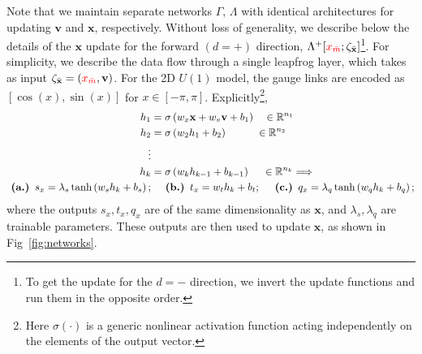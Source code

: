 \documentclass[a4paper,11pt]{article}
\newcommand{\x}{\mathbf{x}}
\newcommand{\p}{\mathbf{v}}
\newcommand{\xmaskbar}{\textcolor{red}{x_{\bar{m}}}}
\begin{document}
Note that we maintain separate networks \(\Gamma\), \(\Lambda\) with
identical architectures for updating \(\p\) and \(\x\), respectively.
%
Without loss of generality, we describe below the details of the \(\x\) update
for the forward \((d = +)\) direction, \(\Lambda^{+}[\xmaskbar;
\zeta_{\bar{\x}}]\)\footnote{
    To get the update for the \(d=-\) direction, we invert the
    update functions and run them in the opposite order.
}.
%
For simplicity, we describe the data flow through a single leapfrog layer,
%
which takes as input \(\zeta_{\bar{\x}} = (\xmaskbar, \p)\).
%
For the 2D \(U(1)\) model, the gauge links are encoded as \([\cos(x),
\sin(x)]\) for \(x \in [-\pi, \pi]\).
%
Explicitly\footnote{
Here \(\sigma(\cdot)\) is a generic nonlinear activation function
acting independently on the elements of the output vector.
},
%
\begin{align}
    h_{1} &= \sigma\left(w_{x} \x + w_{v} \p + b_{1}\right)
        \quad \in \mathbb{R}^{n_{1}} \\
    h_{2} &= \sigma\left(w_{2} h_{1} + b_{2}\right)
        \hspace{0.085\textwidth} \in \mathbb{R}^{n_{2}} \\
    \nonumber \vdots & \\
    h_{k} &= \sigma\left(w_{k} h_{k-1} + b_{k-1}\right)
        \hspace{0.04\textwidth} \in \mathbb{R}^{n_{k}} \Longrightarrow \\
    \nonumber
    \textbf{  (a.)  } s_{x} = \lambda_{s} \tanh \left( w_{s} h_{k} + b_{s} \right);
    &\quad\textbf{  (b.)  } t_{x} = w_{t} h_{k} + b_{t};
    \quad\textbf{  (c.)  } q_{x} = \lambda_{q}\tanh\left(w_{q} h_{k} + b_{q}\right);
\end{align}
%
where the outputs \(s_{x}, t_{x}, q_{x}\) are of the same dimensionality as
\(\x\), and \(\lambda_{s}, \lambda_{q}\) are trainable parameters.
%
These outputs are then used to update \(\x\), as shown in
Fig~\ref{fig:networks}.
\end{document}
